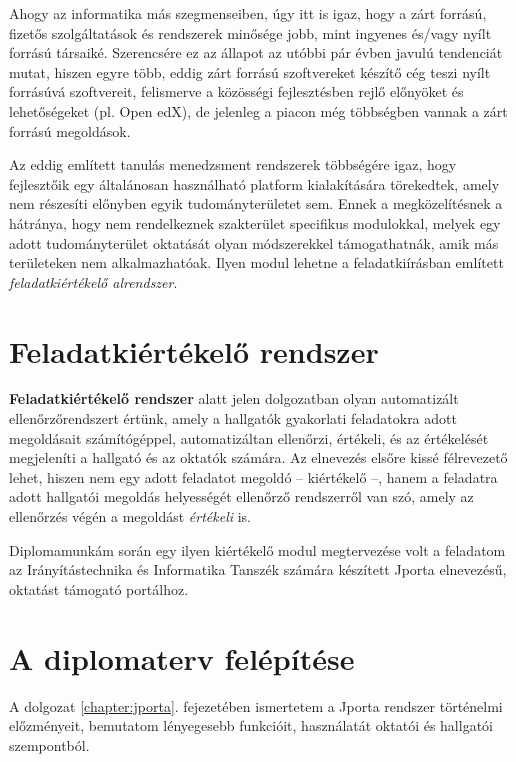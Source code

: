 Ahogy az informatika más szegmenseiben, úgy itt is igaz, hogy a zárt forrású, fizetős szolgáltatások és rendszerek minősége jobb, mint ingyenes és/vagy nyílt forrású társaiké.
Szerencsére ez az állapot az utóbbi pár évben javulú tendenciát mutat, hiszen egyre több, eddig zárt forrású szoftvereket készítő cég teszi nyílt forrásúvá szoftvereit, felismerve a közösségi fejlesztésben rejlő előnyöket és lehetőségeket (pl. Open edX), de jelenleg a piacon még többségben vannak a zárt forrású megoldások.

Az eddig említett tanulás menedzsment rendszerek többségére igaz, hogy fejlesztőik egy általánosan használható platform kialakítására törekedtek, amely nem részesíti előnyben egyik tudományterületet sem.
Ennek a megközelítésnek a hátránya, hogy nem rendelkeznek szakterület specifikus modulokkal, melyek egy adott tudományterület oktatását olyan módszerekkel támogathatnák, amik más területeken nem alkalmazhatóak.
Ilyen modul lehetne a feladatkiírásban említett \textit{feladatkiértékelő alrendszer}.

\section*{Feladatkiértékelő rendszer}
\textbf{Feladatkiértékelő rendszer} alatt jelen dolgozatban olyan automatizált ellenőrzőrendszert értünk, amely a hallgatók gyakorlati feladatokra adott megoldásait számítógéppel, automatizáltan ellenőrzi, értékeli, és az értékelését megjeleníti a hallgató és az oktatók számára.
Az elnevezés elsőre kissé félrevezető lehet, hiszen nem egy adott feladatot megoldó -- kiértékelő --, hanem a feladatra adott hallgatói megoldás helyességét ellenőrző rendszerről van szó, amely az ellenőrzés végén a megoldást \textit{értékeli} is.

Diplomamunkám során egy ilyen kiértékelő modul megtervezése volt a feladatom az Irányítástechnika és Informatika Tanszék számára készített Jporta elnevezésű, oktatást támogató portálhoz.

\section*{A diplomaterv felépítése}
A dolgozat \ref{chapter:jporta}. fejezetében ismertetem a Jporta rendszer történelmi előzményeit, bemutatom lényegesebb funkcióit, használatát oktatói és hallgatói szempontból.

